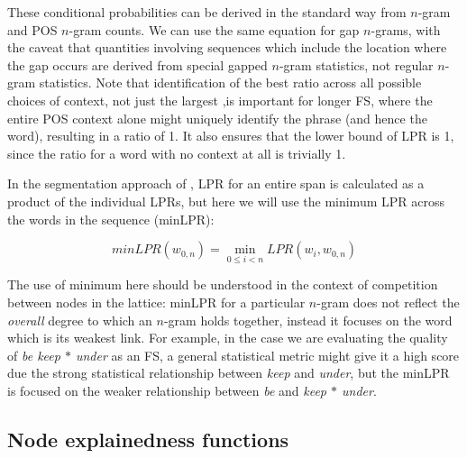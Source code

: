 \documentclass[11pt,letterpaper]{article}
\newcommand{\gap}{$*$\xspace}
\newcommand{\ex}[1]{\textit{#1}\xspace}
\begin{document}
These conditional probabilities can be derived in the standard way from $n$-gram and POS $n$-gram counts. We can use the same equation for gap $n$-grams, with the caveat that quantities involving sequences which include the location where the gap occurs are derived from special gapped $n$-gram statistics, not regular $n$-gram statistics. Note that identification of the best ratio across all possible choices of context, not just the largest ,is important for longer FS, where the entire POS context alone might uniquely identify the phrase (and hence the word), resulting in a ratio of 1. It also ensures that the lower bound of LPR is 1, since the ratio for a word with no context at all is trivially 1.

In the segmentation approach of , LPR for an entire span is calculated as a product of the individual LPRs, but here we will use the minimum LPR across the words in the sequence (minLPR):

\begin{displaymath}
minLPR(w_{0,n}) = \min_{0 \leq i < n }{LPR(w_i,w_{0,n})}
\end{displaymath}

The use of minimum here should be understood in the context of competition between nodes in the lattice: minLPR for a particular $n$-gram does not reflect the \emph{overall}
degree to which an $n$-gram holds together, instead it focuses on the word which is its weakest link. For example, in the case we are evaluating the quality of \ex{be keep \gap under} as an FS, a general statistical metric might give it a high score due the strong statistical relationship between \ex{keep} and \ex{under}, but the minLPR is focused on the weaker relationship between \ex{be} and \ex{keep \gap under}.


\subsection{Node explainedness functions}
\end{document}
